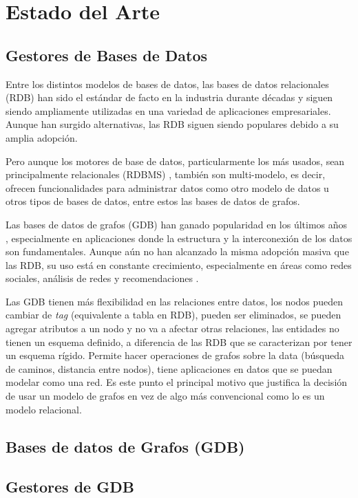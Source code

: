 \chapter{Estado del Arte}

\section{Gestores de Bases de Datos}

Entre los distintos modelos de bases de datos, las bases de datos relacionales (RDB) han sido el estándar de facto en la industria durante décadas y siguen siendo ampliamente utilizadas en una variedad de aplicaciones empresariales. Aunque han surgido alternativas, las RDB siguen siendo populares debido a su amplia adopción.

Pero aunque los motores de base de datos, particularmente los más usados, sean principalmente relacionales (RDBMS) \cite{DB_ranking}, también son multi-modelo, es decir, ofrecen funcionalidades para administrar datos como otro modelo de datos u otros tipos de bases de datos, entre estos las bases de datos de grafos.

Las bases de datos de grafos (GDB) han ganado popularidad en los últimos años \cite{Goasduff_2021}, especialmente en aplicaciones donde la estructura y la interconexión de los datos son fundamentales. Aunque aún no han alcanzado la misma adopción masiva que las RDB, su uso está en constante crecimiento, especialmente en áreas como redes sociales, análisis de redes y recomendaciones \cite{aryono2016modelling, DBLP:journals/tgis/ParkC23, 9216015}. 

Las GDB tienen más flexibilidad en las relaciones entre datos, los nodos pueden cambiar de \textit{tag} (equivalente a tabla en RDB), pueden ser eliminados, se pueden agregar atributos a un nodo y no va a afectar otras relaciones, las entidades no tienen un esquema definido, a diferencia de las RDB que se caracterizan por tener un esquema rígido. Permite hacer operaciones de grafos sobre la data (búsqueda de caminos, distancia entre nodos), tiene aplicaciones en datos que se puedan modelar como una red. Es este punto el principal motivo que justifica la decisión de usar un modelo de grafos en vez de algo más convencional como lo es un modelo relacional.

\section{Bases de datos de Grafos (GDB)}

\section{Gestores de GDB}